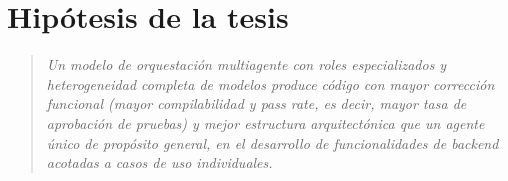 \section{Hipótesis de la tesis}
\label{sec:hipotesis}


\begin{quote}
  \textit{Un modelo de orquestación multiagente con roles especializados y heterogeneidad completa de modelos produce código con mayor corrección funcional (mayor compilabilidad y pass rate, es decir, mayor tasa de aprobación de pruebas) y mejor estructura arquitectónica que un agente único de propósito general, en el desarrollo de funcionalidades de backend acotadas a casos de uso individuales.}
\end{quote}
